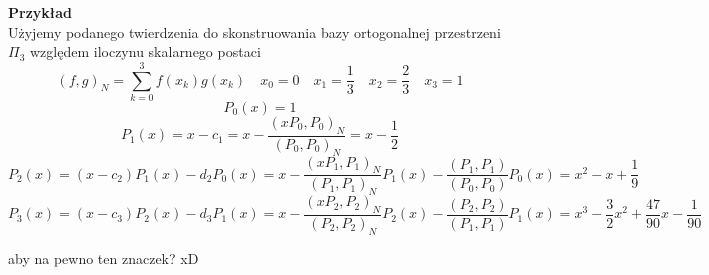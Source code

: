\documentclass[polish]{kbk}
\begin{document}
\textbf{Przykład} \\
Użyjemy podanego twierdzenia do skonstruowania bazy ortogonalnej przestrzeni \( \Pi_3 \) względem iloczynu skalarnego postaci
$$ (f,g)_N = \sum_{k=0}^3 f(x_k)g(x_k) \quad x_0 = 0 \quad x_1 = \frac{1}{3} \quad x_2 = \frac{2}{3} \quad x_3 = 1 $$
$$ P_0(x) = 1 $$
$$ P_1(x) = x - c_1 = x - \frac{ (xP_0, P_0)_N } { (P_0, P_0 )_N} = x - \frac{1}{2} $$
$$ P_2(x) = (x-c_2)P_1(x) - d_2P_0(x) = x - \frac{ (xP_1, P_1)_N } { (P_1, P_1 )_N} P_1(x) - \frac{ (P_1, P_1 ) } { (P_0, P_0 ) } P_0(x) = x^2 - x + \frac{1}{9}$$ 
$$ P_3(x) = (x-c_3)P_2(x) - d_3P_1(x) = x - \frac{ (xP_2, P_2)_N } { (P_2, P_2 )_N} P_2(x) - \frac{ (P_2, P_2 ) } { (P_1, P_1 ) } P_1(x) = x^3 - \frac{3}{2}x^2 + \frac{47}{90}x - \frac{1}{90}$$

\begin{thebibliography}{99}
 aby na pewno ten znaczek? xD

\end{thebibliography}
\end{document}
